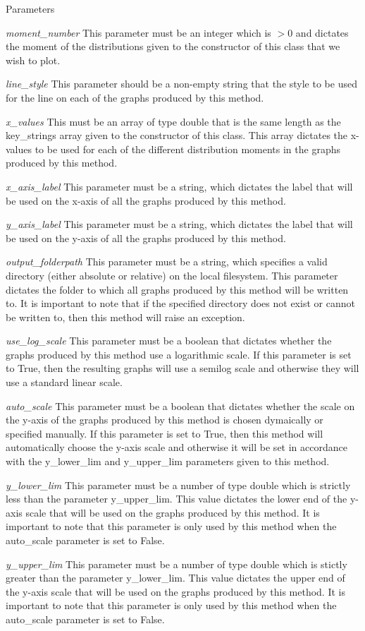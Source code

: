 \begin{DoxyParams}{Parameters}
\item[{\em moment\_\-number}]This parameter must be an integer which is $>$0 and dictates the moment of the distributions given to the constructor of this class that we wish to plot. \item[{\em line\_\-style}]This parameter should be a non-\/empty string that the style to be used for the line on each of the graphs produced by this method. \item[{\em x\_\-values}]This must be an array of type double that is the same length as the key\_\-strings array given to the constructor of this class. This array dictates the x-\/values to be used for each of the different distribution moments in the graphs produced by this method. \item[{\em x\_\-axis\_\-label}]This parameter must be a string, which dictates the label that will be used on the x-\/axis of all the graphs produced by this method. \item[{\em y\_\-axis\_\-label}]This parameter must be a string, which dictates the label that will be used on the y-\/axis of all the graphs produced by this method. \item[{\em output\_\-folderpath}]This parameter must be a string, which specifies a valid directory (either absolute or relative) on the local filesystem. This parameter dictates the folder to which all graphs produced by this method will be written to. It is important to note that if the specified directory does not exist or cannot be written to, then this method will raise an exception. \item[{\em use\_\-log\_\-scale}]This parameter must be a boolean that dictates whether the graphs produced by this method use a logarithmic scale. If this parameter is set to True, then the resulting graphs will use a semilog scale and otherwise they will use a standard linear scale. \item[{\em auto\_\-scale}]This parameter must be a boolean that dictates whether the scale on the y-\/axis of the graphs produced by this method is chosen dymaically or specified manually. If this parameter is set to True, then this method will automatically choose the y-\/axis scale and otherwise it will be set in accordance with the y\_\-lower\_\-lim and y\_\-upper\_\-lim parameters given to this method. \item[{\em y\_\-lower\_\-lim}]This parameter must be a number of type double which is strictly less than the parameter y\_\-upper\_\-lim. This value dictates the lower end of the y-\/axis scale that will be used on the graphs produced by this method. It is important to note that this parameter is only used by this method when the auto\_\-scale parameter is set to False. \item[{\em y\_\-upper\_\-lim}]This parameter must be a number of type double which is stictly greater than the parameter y\_\-lower\_\-lim. This value dictates the upper end of the y-\/axis scale that will be used on the graphs produced by this method. It is important to note that this parameter is only used by this method when the auto\_\-scale parameter is set to False. \end{DoxyParams}
